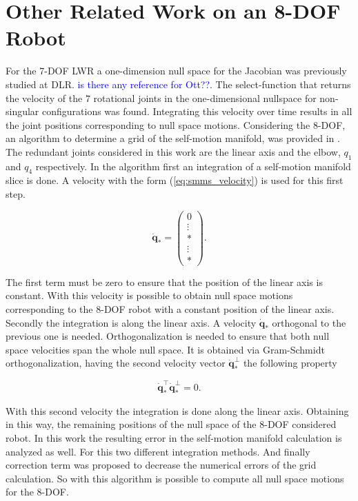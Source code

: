 \section{Other Related Work on an 8-DOF Robot}
\label{sec:Fabianstuff}


For the 7-DOF LWR a  one-dimension null space for the Jacobian   was previously studied at DLR. \textcolor{blue}{is there any reference for Ott??}. 
The select-function that returns the velocity of the 7 rotational joints in the one-dimensional nullspace for non-singular configurations was found. Integrating this velocity over time results in all the joint positions corresponding to null space motions.
%
Considering the  8-DOF, an algorithm to determine a grid of the self-motion manifold, was provided in \cite{fabianthesis}. The redundant joints considered in this work are the linear axis and the elbow, $q_1$ and $q_4$ respectively. In the algorithm first an integration of a self-motion manifold slice is done. A velocity with the form (\ref{eq:smms_velocity}) is used for this first step. 

\begin{equation}
\dot{\mathbf{q}}_* =\begin{pmatrix}0 \\ \vdots  \\ *\\ \vdots\\ *\end{pmatrix}.
\label{eq:smms_velocity}
\end{equation} 

The first term must be zero to ensure that the position of the linear axis is constant.
With this velocity is possible to obtain null space motions corresponding to the 8-DOF robot with a constant position of the linear axis.
Secondly the integration is along the linear axis. A velocity $\dot{\mathbf{q}}_*$ orthogonal to the previous one is needed. Orthogonalization is needed to ensure that both null space velocities span the whole null space. It is obtained via Gram-Schmidt orthogonalization, having the second velocity vector $\dot{\mathbf{q}}_*^{\bot}$ the following property

\begin{equation}
\dot{\mathbf{q}}_*^\top\dot{\mathbf{q}}_*^{\bot}=0.
\label{eq:orthogonalVelocityVectors}
\end{equation}

With this second velocity the integration is done along the linear axis. Obtaining in this way, the remaining positions of the null space of the 8-DOF considered robot.
%
In this work the resulting error in the self-motion manifold calculation is analyzed as well. For this two different integration methods. And finally correction term was proposed to decrease the numerical errors of the grid calculation.  
%
So with this algorithm is possible to compute all null space motions for the 8-DOF. 


